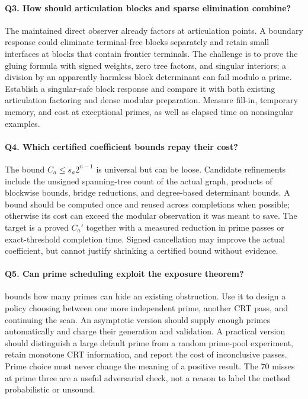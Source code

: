 \paragraph{Q3. How should articulation blocks and sparse elimination combine?}
The maintained direct observer already factors at articulation points. A
boundary response could eliminate terminal-free blocks separately and retain
small interfaces at blocks that contain frontier terminals. The challenge is
to prove the gluing formula with signed weights, zero tree factors, and singular
interiors; a division by an apparently harmless block determinant can fail
modulo a prime. Establish a singular-safe block response and compare it with
both existing articulation factoring and dense modular preparation. Measure
fill-in, temporary memory, and cost at exceptional primes, as well as elapsed
time on nonsingular examples.

\paragraph{Q4. Which certified coefficient bounds repay their cost?}
The bound $C_a\le s_a2^{n-1}$ is universal but can be loose. Candidate refinements
include the unsigned spanning-tree count of the actual graph, products of
blockwise bounds, bridge reductions, and degree-based determinant bounds. A
bound should be computed once and reused across completions when possible;
otherwise its cost can exceed the modular observation it was meant to save.
The target is a proved $C_a'$ together with a measured reduction in prime passes
or exact-threshold completion time. Signed cancellation may improve the actual
coefficient, but cannot justify shrinking a certified bound without evidence.

\paragraph{Q5. Can prime scheduling exploit the exposure theorem?}
 bounds how many primes can hide an existing
obstruction. Use it to design a policy choosing between one more independent
prime, another CRT pass, and continuing the scan. An asymptotic version should
supply enough primes automatically and charge their generation and validation.
A practical version should distinguish a large default prime from a random
prime-pool experiment, retain monotone CRT information, and report the cost
of inconclusive passes. Prime choice must never change the meaning of a
positive result. The 70 misses at prime three are a useful adversarial check,
not a reason to label the method probabilistic or unsound.

